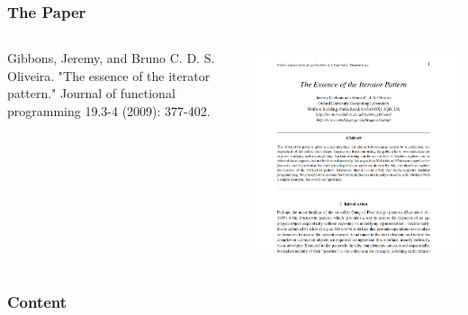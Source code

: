 \documentclass[aspectratio=169]{beamer}
\begin{document}
\begin{frame}[fragile]
  \frametitle{The Paper}
  \begin{columns}
    \begin{column}{0.4\textwidth}
      \begin{center}
        \small
        Gibbons, Jeremy, and Bruno C. D. S. Oliveira. "The essence of
        the iterator pattern." Journal of functional programming 19.3-4
        (2009): 377-402.
      \end{center}

    \end{column}
    \begin{column}{0.7\textwidth}
      \begin{center}
        \includegraphics[height=0.8\textheight, valign=c]{static-images/eip.png}
      \end{center}
    \end{column}
  \end{columns}
\end{frame}

\begin{frame}[fragile]
  \frametitle{Content}
  \begin{center}
  \end{center}
\end{frame}
\end{document}
